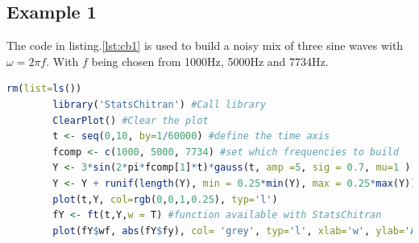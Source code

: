 \documentclass{article}
\begin{document}
	\subsection{Example 1}
	The code in  listing.\ref{lst:cb1} is used to build a noisy mix of three sine waves with $\omega = 2\pi f$. With $f$ being chosen from 1000\si[]{Hz}, 5000\si[]{Hz} and 7734\si{Hz}.
	 \begin{lstlisting}[language=R, label={lst:cb1}, caption={code for simulating three frequency signal in fig.\ref{F1a} and its fourier transform in fig.\ref{F1b}}, captionpos=b]
	 	rm(list=ls())
	 	library('StatsChitran') #Call library
	 	ClearPlot() #Clear the plot
	 	t <- seq(0,10, by=1/60000) #define the time axis
	 	fcomp <- c(1000, 5000, 7734) #set which frequencies to build
	 	Y <- 3*sin(2*pi*fcomp[1]*t)*gauss(t, amp =5, sig = 0.7, mu=1 ) + 5*sin(2*pi*fcomp[2]*t)*gauss(t, amp = 4, sig = 1, mu=3) + 4*sin(2*pi*fcomp[3]*t)*gauss(t, amp = 4.3, sig = 3, mu=7) #define signal
	 	Y <- Y + runif(length(Y), min = 0.25*min(Y), max = 0.25*max(Y)) #add noise
	 	plot(t,Y, col=rgb(0,0,1,0.25), typ='l')
	 	fY <- ft(t,Y,w = T) #function available with StatsChitran
	 	plot(fY$wf, abs(fY$fy), col= 'grey', typ='l', xlab='w', ylab='Amp')
	 \end{lstlisting}
\end{document}
